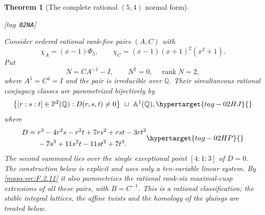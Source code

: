 \documentclass[11pt,a4paper]{article}
\numberwithin{equation}{section}
\newtheorem{theorem}{Theorem}[section]
\theoremstyle{definition}
\newcommand{\StatementRecord}[4]{{\upshape\footnotesize[tag~\texttt{#3}]}\enspace\ignorespaces}
\begin{document}
\begin{theorem}[The complete rational $(5,4)$ normal form]\hypertarget{tag-02NA}{}\label{maps:src:F.2.20}
\StatementRecord{maps:src:F.2.20}{proved}{02NA}{\cref{maps:src:F.2.11}, \eqref{maps:eq:F.R4}, \eqref{maps:eq:F.R6}, \eqref{maps:eq:F.R7}, \eqref{maps:eq:F.R8}}


Consider ordered rational rank-five pairs $(A,C)$ with
\[
 \chi_A=(x-1)\Phi_5,
 \qquad \chi_C=(x-1)(x+1)^2(x^2+1).
\]
Put
\[
 N=CA^{-1}-I,
 \qquad N^2=0,\quad\operatorname{rank}N=2,
\]
where $A^5=C^4=I$ and the pair is irreducible over $\mathbb Q$.
Their simultaneous rational conjugacy classes are parametrized
bijectively by
\begin{equation}
 \bigl\{[r:s:t]\in\mathbb P^2(\mathbb Q):D(r,s,t)\ne0\bigr\}
 \ \sqcup\ \mathbb A^1(\mathbb Q),
 \hypertarget{tag-02HJ}{}\label{maps:eq:F.R1}
\end{equation}
where
\begin{equation}
\begin{split}
 D={}&r^3-4r^2s-r^2t+7rs^2+rst-3rt^2\\
     &{}-7s^3+11s^2t-11st^2+7t^3.
\end{split}
 \hypertarget{tag-02HP}{}\label{maps:eq:F.R2}
\end{equation}
The second summand lies over the single exceptional point
$[4:1:3]$ of $D=0$.  The construction below is explicit and
uses only a ten-variable linear system.  By \ref{maps:src:F.2.11} it also
parametrizes the rational rank-six maximal-cusp extensions
of all these pairs, with $B=C^{-1}$.
This is a rational classification; the stable integral lattices, the affine twists and the homology of the gluings are treated below.

\end{theorem}
\end{document}

